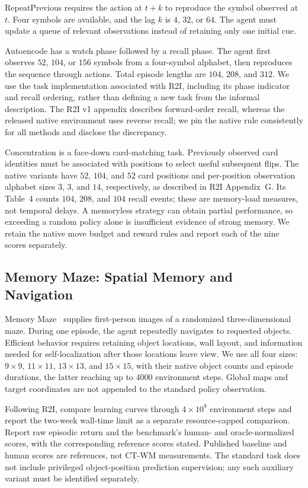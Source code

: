 \documentclass{article}
\begin{document}
RepeatPrevious requires the action at $t+k$ to reproduce the symbol observed at $t$. Four symbols are available, and the lag $k$ is $4$, $32$, or $64$. The agent must update a queue of relevant observations instead of retaining only one initial cue.

Autoencode has a watch phase followed by a recall phase. The agent first observes $52$, $104$, or $156$ symbols from a four-symbol alphabet, then reproduces the sequence through actions. Total episode lengths are $104$, $208$, and $312$. We use the task implementation associated with R2I, including its phase indicator and recall ordering, rather than defining a new task from the informal description. The R2I v1 appendix describes forward-order recall, whereas the released native environment uses reverse recall; we pin the native rule consistently for all methods and disclose the discrepancy.

Concentration is a face-down card-matching task. Previously observed card identities must be associated with positions to select useful subsequent flips. The native variants have $52$, $104$, and $52$ card positions and per-position observation alphabet sizes $3$, $3$, and $14$, respectively, as described in R2I Appendix~G. Its Table~4 counts $104$, $208$, and $104$ recall events; these are memory-load measures, not temporal delays. A memoryless strategy can obtain partial performance, so exceeding a random policy alone is insufficient evidence of strong memory. We retain the native move budget and reward rules and report each of the nine scores separately.

\subsection{Memory Maze: Spatial Memory and Navigation}

Memory Maze~\cite{pasukonis2022memorymaze} supplies first-person images of a randomized three-dimensional maze. During one episode, the agent repeatedly navigates to requested objects. Efficient behavior requires retaining object locations, wall layout, and information needed for self-localization after those locations leave view. We use all four sizes: $9\times9$, $11\times11$, $13\times13$, and $15\times15$, with their native object counts and episode durations, the latter reaching up to 4000 environment steps. Global maps and target coordinates are not appended to the standard policy observation.

Following R2I, compare learning curves through $4\times10^8$ environment steps and report the two-week wall-time limit as a separate resource-capped comparison. Report raw episodic return and the benchmark's human- and oracle-normalized scores, with the corresponding reference scores stated. Published baseline and human scores are references, not CT-WM measurements. The standard task does not include privileged object-position prediction supervision; any such auxiliary variant must be identified separately.
\end{document}
